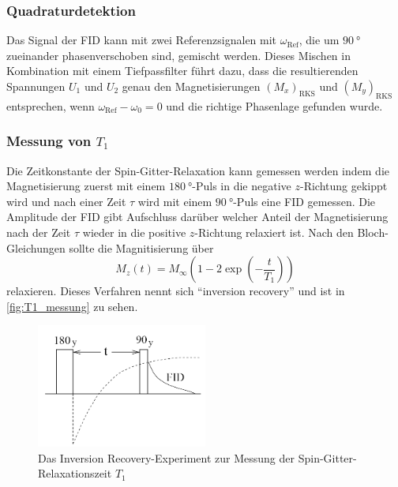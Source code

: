 \subsubsection{Quadraturdetektion}
\label{sssec:Quadraturdetektion}

Das Signal der FID kann mit zwei Referenzsignalen mit $\omega_\text{Ref}$,
die um $\SI{90}{\degree}$ zueinander phasenverschoben sind, gemischt werden.
Dieses Mischen in Kombination mit einem Tiefpassfilter führt dazu, 
dass die resultierenden Spannungen $U_1$ und $U_2$ genau den Magnetisierungen $(M_x)_\text{RKS}$ und $(M_y)_\text{RKS}$ entsprechen,
wenn $\omega_\text{Ref} - \omega_0 = 0$ und die richtige Phasenlage gefunden wurde.

\subsubsection{Messung von \texorpdfstring{$T_1$}{T1}}
\label{sssec:T1_Messung}

Die Zeitkonstante der Spin-Gitter-Relaxation kann gemessen werden 
indem die Magnetisierung zuerst mit einem $\SI{180}{\degree}$-Puls in die negative $z$-Richtung gekippt wird
und nach einer Zeit $\tau$ wird mit einem $\SI{90}{\degree}$-Puls eine FID gemessen.
Die Amplitude der FID gibt Aufschluss darüber welcher Anteil der Magnetisierung nach der Zeit $\tau$ wieder in die positive $z$-Richtung relaxiert ist.
Nach den Bloch-Gleichungen sollte die Magnitisierung über
\begin{equation}
    M_z(t) = M_\infty\left(1-2\exp\left(-\frac{t}{T_1}\right)\right)
    \label{eq:T1_relaxation}
\end{equation} 
relaxieren.
Dieses Verfahren nennt sich \enquote{inversion recovery} und ist in \autoref{fig:T1_messung} zu sehen.

\begin{figure}
    \centering
    \includegraphics[width=0.5\textwidth]{images/T1_messung.png}
    \caption{Das Inversion Recovery-Experiment zur Messung der Spin-Gitter-Relaxationszeit $T_1$}
    \label{fig:T1_messung}
\end{figure}

